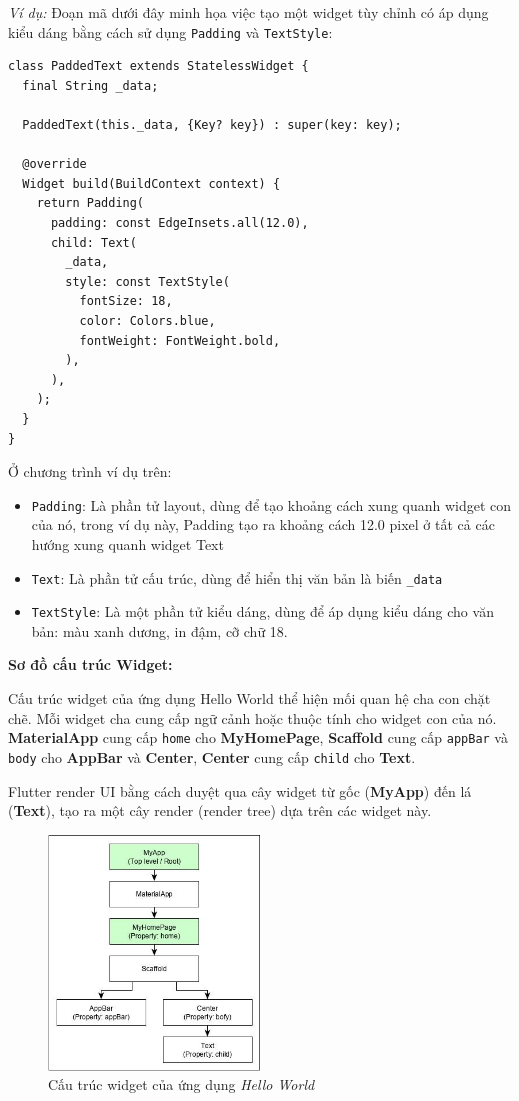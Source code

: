 \documentclass[../DoAn.tex]{subfiles}
\numberwithin{figure}{chapter}
\begin{document}
\textit{Ví dụ:}
Đoạn mã dưới đây minh họa việc tạo một widget tùy chỉnh có áp dụng kiểu dáng bằng cách sử dụng \texttt{Padding} và \texttt{TextStyle}:

\begin{lstlisting}
class PaddedText extends StatelessWidget {
  final String _data;

  PaddedText(this._data, {Key? key}) : super(key: key);

  @override
  Widget build(BuildContext context) {
    return Padding(
      padding: const EdgeInsets.all(12.0),
      child: Text(
        _data,
        style: const TextStyle(
          fontSize: 18,
          color: Colors.blue,
          fontWeight: FontWeight.bold,
        ),
      ),
    );
  }
}
\end{lstlisting}

Ở chương trình ví dụ trên:
\begin{itemize}
    \item \texttt{Padding}: Là phần tử layout, dùng để tạo khoảng cách xung quanh widget con của nó, trong ví dụ này, Padding tạo ra khoảng cách 12.0 pixel ở tất cả các hướng xung quanh widget Text
    \item \texttt{Text}: Là phần tử cấu trúc, dùng để hiển thị văn bản là biến \texttt{\_data}
    \item \texttt{TextStyle}: Là một phần tử kiểu dáng, dùng để áp dụng kiểu dáng cho văn bản: màu xanh dương, in đậm, cỡ chữ 18.
\end{itemize}
\textbf{Sơ đồ cấu trúc Widget:}

Cấu trúc widget của ứng dụng Hello World thể hiện mối quan hệ cha con chặt chẽ. Mỗi widget cha cung cấp ngữ cảnh hoặc thuộc tính cho widget con của nó. \textbf{MaterialApp} cung cấp \texttt{home} cho \textbf{MyHomePage}, \textbf{Scaffold} cung cấp \texttt{appBar} và \texttt{body} cho \textbf{AppBar} và \textbf{Center}, \textbf{Center} cung cấp \texttt{child} cho \textbf{Text}.

Flutter render UI bằng cách duyệt qua cây widget từ gốc (\textbf{MyApp}) đến lá (\textbf{Text}), tạo ra một cây render (render tree) dựa trên các widget này.
\begin{figure}[H]
    \centering
    \includegraphics[width=0.5\textwidth]{Hinhve/Chuong5/flutterwidgetsstructure.png}
    \caption{Cấu trúc widget của ứng dụng \textit{Hello World}}
    \label{fig:flutterwidgetsstructure}
\end{figure}
\end{document}
